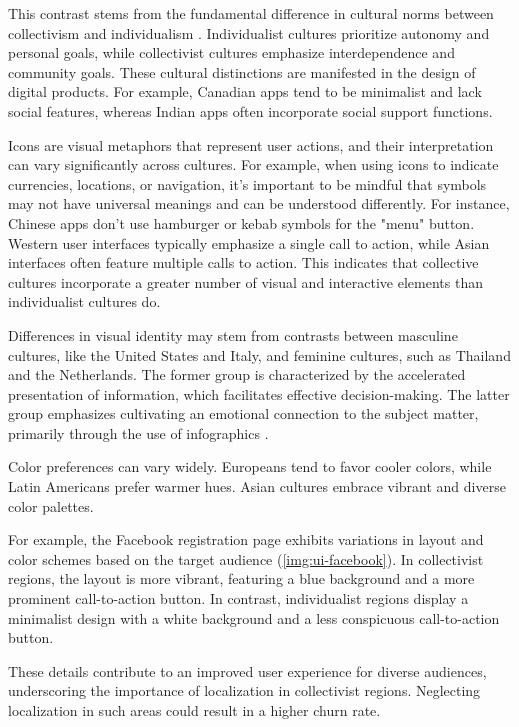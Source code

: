 This contrast stems from the fundamental difference in cultural norms between collectivism and individualism 
\cite{Wall23}. Individualist cultures prioritize autonomy and personal goals, while collectivist cultures emphasize 
interdependence and community goals. These cultural distinctions are manifested in the design of digital products. For 
example, Canadian apps tend to be minimalist and lack social features, whereas Indian apps often incorporate social 
support functions.

Icons are visual metaphors that represent user actions, and their interpretation can vary significantly across cultures. 
For example, when using icons to indicate currencies, locations, or navigation, it's important to be mindful that 
symbols may not have universal meanings and can be understood differently. For instance, Chinese apps don't use 
hamburger or kebab symbols for the "menu" button. Western user interfaces typically emphasize a single call to action, 
while Asian interfaces often feature multiple calls to action. This indicates that collective cultures incorporate a 
greater number of visual and interactive elements than individualist cultures do.

Differences in visual identity may stem from contrasts between masculine cultures, like the United States and Italy, and 
feminine cultures, such as Thailand and the Netherlands. The former group is characterized by the accelerated 
presentation of information, which facilitates effective decision-making. The latter group emphasizes cultivating an 
emotional connection to the subject matter, primarily through the use of infographics \cite{Wal923}.

Color preferences can vary widely. Europeans tend to favor cooler colors, while Latin Americans prefer warmer hues. 
Asian cultures embrace vibrant and diverse color palettes.

For example, the Facebook registration page exhibits variations in layout and color schemes based on the
target audience (\cref{img:ui-facebook}). In collectivist regions, the layout is more vibrant, featuring a blue 
background and a more prominent call-to-action button. In contrast, individualist regions display a minimalist design 
with a white background and a less conspicuous call-to-action button.


\noindent These details \cite{Rein14} contribute to an improved user experience for diverse audiences, underscoring the 
importance of localization in collectivist regions. Neglecting localization in such areas could result in a higher 
churn rate.


